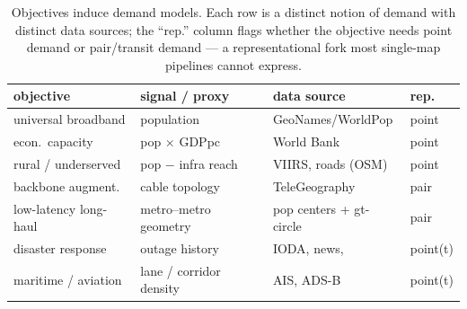 
\begin{table}[t]
  \centering\small
  \caption{Objectives induce demand models. Each row is a distinct notion of
  demand with distinct data sources; the ``rep.'' column flags whether the
  objective needs point demand or pair/transit demand — a representational
  fork most single-map pipelines cannot express. }
  \label{tab:taxonomy}
  \begin{tabular}{llll}
    \toprule
    objective & signal / proxy & data source & rep. \\
    \midrule
    universal broadband   & population            & GeoNames/WorldPop      & point \\
    econ.\ capacity       & pop $\times$ GDPpc    & World Bank             & point \\
    rural / underserved   & pop $-$ infra reach   & VIIRS, roads (OSM)     & point \\
    backbone augment.     & cable topology        & TeleGeography          & pair  \\
    low-latency long-haul & metro--metro geometry & pop centers + gt-circle & pair \\
    disaster response     & outage history        & IODA, news, \todo{}    & point(t) \\
    maritime / aviation   & lane / corridor density & AIS, ADS-B           & point(t) \\
    \bottomrule
  \end{tabular}
\end{table}



